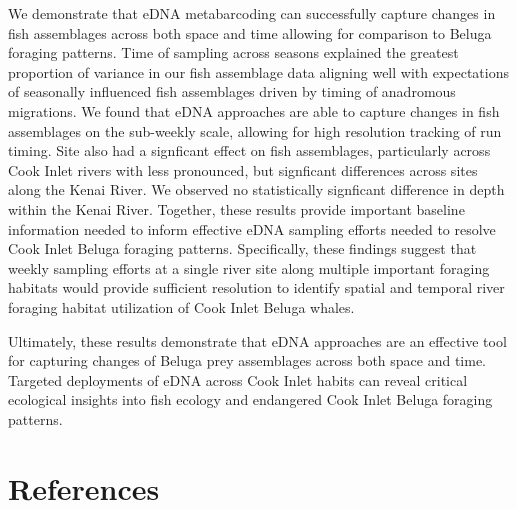 \documentclass[
]{article}
\begin{document}
We demonstrate that eDNA metabarcoding can successfully capture changes
in fish assemblages across both space and time allowing for comparison
to Beluga foraging patterns. Time of sampling across seasons explained
the greatest proportion of variance in our fish assemblage data aligning
well with expectations of seasonally influenced fish assemblages driven
by timing of anadromous migrations. We found that eDNA approaches are
able to capture changes in fish assemblages on the sub-weekly scale,
allowing for high resolution tracking of run timing. Site also had a
signficant effect on fish assemblages, particularly across Cook Inlet
rivers with less pronounced, but signficant differences across sites
along the Kenai River. We observed no statistically signficant
difference in depth within the Kenai River. Together, these results
provide important baseline information needed to inform effective eDNA
sampling efforts needed to resolve Cook Inlet Beluga foraging patterns.
Specifically, these findings suggest that weekly sampling efforts at a
single river site along multiple important foraging habitats would
provide sufficient resolution to identify spatial and temporal river
foraging habitat utilization of Cook Inlet Beluga whales.

Ultimately, these results demonstrate that eDNA approaches are an
effective tool for capturing changes of Beluga prey assemblages across
both space and time. Targeted deployments of eDNA across Cook Inlet
habits can reveal critical ecological insights into fish ecology and
endangered Cook Inlet Beluga foraging patterns.

\hypertarget{references}{%
\section*{References}\label{references}}
\end{document}
